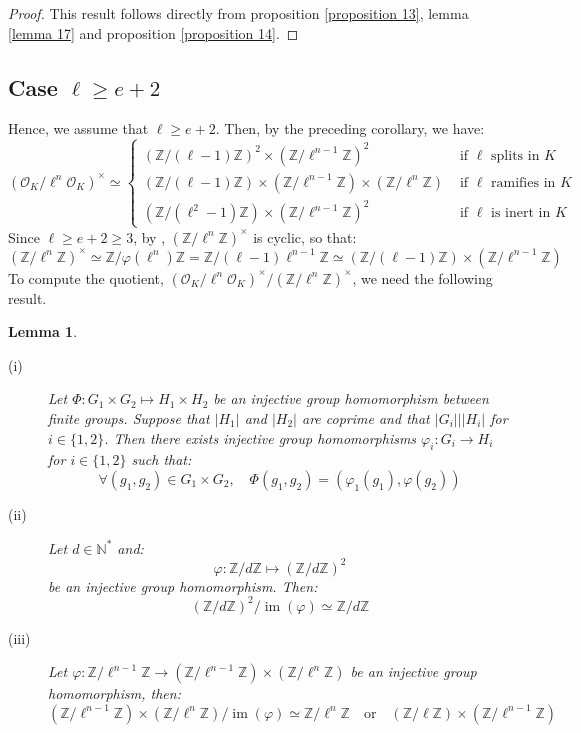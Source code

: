 \documentclass[a4paper,10pt]{report}
\theoremstyle{definition}
\theoremstyle{plain}
\newtheorem{lemma}[definition]{Lemma}
\theoremstyle{definition}
\newcommand{\N}{\mathbb{N}}
\newcommand{\Z}{\mathbb{Z}}
\newcommand{\mO}{\mathcal{O}}
\DeclareMathOperator{\im}{im}
\renewcommand{\(}{\left(}
\renewcommand{\)}{\right)}
\begin{document}
\begin{proof}
This result follows directly from proposition \ref{proposition 13}, lemma \ref{lemma 17} and proposition \ref{proposition 14}.
\end{proof}

\subsection{Case $\ell\geq e+2$}

Hence, we assume that $\ell\geq e+2$. Then, by the preceding corollary, we have:
\[(\mO_K/\ell^n\mO_K)^\times\simeq \left\{ \begin{array}{ll} 
(\Z/(\ell-1)\Z)^2\times(\Z/\ell^{n-1}\Z)^2 & \mbox{ if $\ell$ splits in $K$}\\
(\Z/(\ell-1)\Z)\times(\Z/\ell^{n-1}\Z)\times(\Z/\ell^{n}\Z)  & \mbox{ if $\ell$ ramifies in $K$}\\ 
(\Z/(\ell^2-1)\Z)\times(\Z/\ell^{n-1}\Z)^2  & \mbox{ if $\ell$ is inert in $K$}
\end{array}\right.\]
Since $\ell\geq e+2\geq 3$, by \cite[theorem IV.2]{Ireland1982}, $(\Z/\ell^n\Z)^\times$ is cyclic, so that:
\[(\Z/\ell^n\Z)^\times\simeq \Z/\varphi(\ell^n)\Z=\Z/(\ell-1)\ell^{n-1}\Z\simeq (\Z/(\ell-1)\Z)\times(\Z/\ell^{n-1}\Z)\]
To compute the quotient, $(\mO_K/\ell^n\mO_K)^\times/(\Z/\ell^n\Z)^\times$, we need the following result.

\begin{lemma}

\begin{description}

\item[(i)] Let $\Phi: G_1\times G_2\longmapsto H_1\times H_2$ be an injective group homomorphism between finite groups. Suppose that $|H_1|$ and $|H_2|$ are coprime and that $|G_i|||H_i|$ for $i\in\{1,2\}$. Then there exists injective group homomorphisms $\varphi_i: G_i\longrightarrow H_i$ for $i\in\{1,2\}$ such that:
\[\forall (g_1, g_2)\in G_1\times G_2, \quad \Phi(g_1,g_2)=(\varphi_1(g_1),\varphi(g_2))\]

\item[(ii)] Let $d\in\N^*$ and:
\[\varphi: \Z/d\Z\longmapsto (\Z/d\Z)^2\]
be an injective group homomorphism. Then:
\[(\Z/d\Z)^2/\im(\varphi)\simeq \Z/d\Z\]

\item[(iii)] Let $\varphi: \Z/\ell^{n-1}\Z\longrightarrow (\Z/\ell^{n-1}\Z)\times(\Z/\ell^{n}\Z)$ be an injective group homomorphism, then:
\[(\Z/\ell^{n-1}\Z)\times(\Z/\ell^{n}\Z)/\im(\varphi)\simeq \Z/\ell^{n}\Z \quad \mbox{or} \quad (\Z/\ell\Z)\times(\Z/\ell^{n-1}\Z)\]
\end{description}

\end{lemma}
\end{document}
